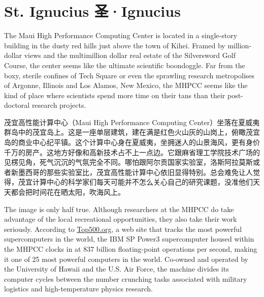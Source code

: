 \chapter{\ifdefined\eng
St. Ignucius
\fi
\ifdefined\chs
圣·Ignucius
\fi}

\ifdefined\eng
The Maui High Performance Computing Center is located in a single-story building in the dusty red hills just above the town of Kihei. Framed by million-dollar views and the multimillion dollar real estate of the Silversword Golf Course, the center seems like the ultimate scientific boondoggle. Far from the boxy, sterile confines of Tech Square or even the sprawling research metropolises of Argonne, Illinois and Los Alamos, New Mexico, the MHPCC seems like the kind of place where scientists spend more time on their tans than their post-doctoral research projects.
\fi

\ifdefined\chs
茂宜高性能计算中心（Maui High Performance Computing Center）坐落在夏威夷群岛中的茂宜岛上。这是一座单层建筑，建在满是红色火山灰的山岗上，俯瞰茂宜岛的商业中心纪平镇。这个计算中心身在夏威夷，坐拥迷人的山景海风，更有身价千万的房产。这地方好像和高新技术占不上一点边。它跟麻省理工学院技术广场的见楞见角，死气沉沉的气氛完全不同。哪怕跟阿尔贡国家实验室，洛斯阿拉莫斯或者新墨西哥的那些实验室比，茂宜高性能计算中心依旧显得特别。总会难免让人觉得，茂宜计算中心的科学家们每天可能并不怎么关心自己的研究课题，没准他们天天都会把时间花在晒太阳，吹海风上。
\fi

\ifdefined\eng
The image is only half true. Although researchers at the MHPCC do take advantage of the local recreational opportunities, they also take their work seriously. According to \url{Top500.org}, a web site that tracks the most powerful supercomputers in the world, the IBM SP Power3 supercomputer housed within the MHPCC clocks in at 837 billion floating-point operations per second, making it one of 25 most powerful computers in the world. Co-owned and operated by the University of Hawaii and the U.S. Air Force, the machine divides its computer cycles between the number crunching tasks associated with military logistics and high-temperature physics research.
\fi

